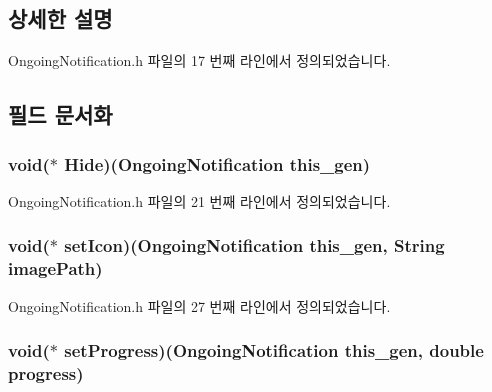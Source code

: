 \subsection{상세한 설명}


Ongoing\-Notification.\-h 파일의 17 번째 라인에서 정의되었습니다.



\subsection{필드 문서화}
\hypertarget{struct___ongoing_notification_afdc0b8cac867cd63e7160f849629b7d2}{
\subsubsection[{Hide}]{\setlength{\rightskip}{0pt plus 5cm}void($\ast$  Hide)({\bf Ongoing\-Notification} this\-\_\-gen)}}\label{struct___ongoing_notification_afdc0b8cac867cd63e7160f849629b7d2}


Ongoing\-Notification.\-h 파일의 21 번째 라인에서 정의되었습니다.

\hypertarget{struct___ongoing_notification_a2df14bd8a05050bcf5225169cbaf94d4}{
\subsubsection[{set\-Icon}]{\setlength{\rightskip}{0pt plus 5cm}void($\ast$  set\-Icon)({\bf Ongoing\-Notification} this\-\_\-gen, {\bf String} image\-Path)}}\label{struct___ongoing_notification_a2df14bd8a05050bcf5225169cbaf94d4}


Ongoing\-Notification.\-h 파일의 27 번째 라인에서 정의되었습니다.

\hypertarget{struct___ongoing_notification_afddc1bda00e4242433a486881aed226c}{
\subsubsection[{set\-Progress}]{\setlength{\rightskip}{0pt plus 5cm}void($\ast$  set\-Progress)({\bf Ongoing\-Notification} this\-\_\-gen, double progress)}}\label{struct___ongoing_notification_afddc1bda00e4242433a486881aed226c}


